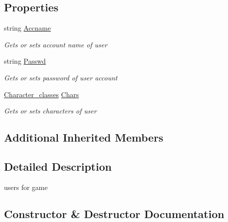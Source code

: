 \subsection*{Properties}
\begin{DoxyCompactItemize}
\item 
string \hyperlink{class_lightdeath_1_1_user_a764e13d8c7bcb74e3373aaddfcc3578d}{Accname}
\begin{DoxyCompactList}\small\item\em Gets or sets account name of user \end{DoxyCompactList}\item 
string \hyperlink{class_lightdeath_1_1_user_ac1613c01ca9ee47faf2fe75cfb836797}{Passwd}
\begin{DoxyCompactList}\small\item\em Gets or sets password of user account \end{DoxyCompactList}\item 
\hyperlink{class_lightdeath_1_1_character__classes}{Character\+\_\+classes} \hyperlink{class_lightdeath_1_1_user_a79375ec28ff18a65b0d9174df55274ce}{Chars}
\begin{DoxyCompactList}\small\item\em Gets or sets characters of user \end{DoxyCompactList}\end{DoxyCompactItemize}
\subsection*{Additional Inherited Members}


\subsection{Detailed Description}
users for game 



\subsection{Constructor \& Destructor Documentation}
\hypertarget{class_lightdeath_1_1_user_abe8e82a95feb78b813517fb95c1531b1}{}\label{class_lightdeath_1_1_user_abe8e82a95feb78b813517fb95c1531b1} 

